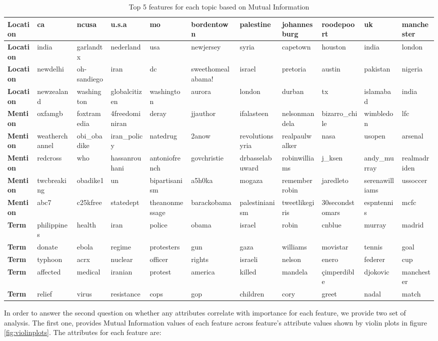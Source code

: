 \begin{table}[ht]
{{\begin{tabular}{|l|l|l|l|l|l|l|l|l|l|l|}
\textbf{Location} & ca & ncusa & u.s.a & mo & bordentown & palestine & johannesburg & roodepoort & uk & manchester \\ \hline
\textbf{Location} & india & garlandtx & nederland & usa & newjersey & syria & capetown & houston & india & london \\ \hline
\textbf{Location} & newdelhi & oh-sandiego & iran & dc & sweethomealabama! & israel & pretoria & austin & pakistan & nigeria \\ \hline
\textbf{Location} & newzealand & washington & globalcitizen & washington & aurora & london & durban & tx & islamabad & india \\ \hline \hline
\textbf{Mention} & oxfamgb & foxtramedia & 4freedominiran & deray & jjauthor & ifalasteen & nelsonmandela & bizarro\_chile & wimbledon & lfc \\ \hline
\textbf{Mention} & weatherchannel & obi\_obadike & iran\_policy & natedrug & 2anow & revolutionsyria & realpaulwalker & nasa & usopen & arsenal \\ \hline
\textbf{Mention} & redcross & who & hassanrouhani & antoniofrench & govchristie & drbasselabuward & robinwilliams & j\_ksen & andy\_murray & realmadriden \\ \hline
\textbf{Mention} & twcbreaking & obadike1 & un & bipartisanism & a5h0ka & mogaza & rememberrobin & jaredleto & serenawilliams & ussoccer \\ \hline
\textbf{Mention} & abc7 & c25kfree & statedept & theanonmessage & barackobama & palestinianism & tweetlikegiris & 30secondstomars & espntennis & mcfc \\ \hline \hline
\textbf{Term} & philippines & health & iran & police & obama & israel & robin & cnblue & murray & madrid \\ \hline
\textbf{Term} & donate & ebola & regime & protesters & gun & gaza & williams & movistar & tennis & goal \\ \hline
\textbf{Term} & typhoon & acrx & nuclear & officer & rights & israeli & nelson & enero & federer & cup \\ \hline
\textbf{Term} & affected & medical & iranian & protest & america & killed & mandela & çimperdible & djokovic & manchester \\ \hline
\textbf{Term} & relief & virus & resistance & cops & gop & children & cory & greet & nadal & match \\ \hline
\end{tabular}
}}
\caption{Top 5 features for each topic based on Mutual Information}
\label{table:top10MItopicsLocations}
\end{table}
In order to answer the second question on whether any attributes correlate with importance for each feature, we provide two set of analysis. The first one, provides Mutual Information values of each feature across feature's attribute values shown by violin plots in figure \ref{fig:violinplots}. The attributes for each feature are:

